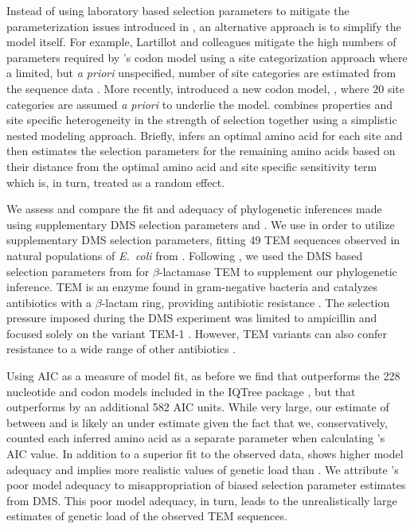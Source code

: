 \documentclass[12pt]{article}
\begin{document}
Instead of using laboratory based selection parameters to mitigate the parameterization issues introduced in \hb, an alternative approach is to simplify the model itself.
For example, Lartillot and colleagues mitigate the high numbers of  parameters required by \hb's codon model using a site categorization approach where a limited, but \emph{a priori} unspecified, number of site categories are estimated from the sequence data \citep{LartillotAndPhilippe2004,le2008,RodrigueEtAl2008,RodrigueAndLartillot2014}.
More recently, \citep{beaulieu2019} introduced a new codon model, \selac, where $20$ site categories are assumed \emph{a priori} to underlie the \hb model.
\selac combines \PC properties and site specific heterogeneity in the strength of selection together using a simplistic nested modeling approach.
Briefly, \selac infers an optimal amino acid for each site and then estimates the selection parameters for the remaining amino acids based on their \PC distance from the optimal amino acid and site specific sensitivity term which is, in turn, treated as a random effect.

We assess and compare the fit and adequacy of phylogenetic inferences made using supplementary DMS selection parameters and \selac. 
We use \phydms \citep{hilton2017} in order to utilize supplementary DMS selection parameters, fitting 49 TEM sequences observed in natural populations of \emph{E.~coli} from \citet{bloom2017}.
Following \citep{bloom2017, hilton2017}, we used the DMS based selection parameters from \citet{stiffler2016} for $\beta$-lactamase TEM to supplement our phylogenetic inference.
TEM is an enzyme found in gram-negative bacteria and catalyzes antibiotics with a $\beta$-lactam ring, providing antibiotic resistance \citep{Neu1969}.
The selection pressure imposed during the DMS experiment was limited to ampicillin and focused solely on the variant TEM-1 \citep{stiffler2016}.
However, TEM variants can also confer resistance to a wide range of other antibiotics \citep{sougakoff1988,sougakoff1989,goussard1991,mabilat1992,chanal1992,brun1994}.

Using AIC as a measure of model fit, as before we find that \phydms outperforms the 228 nucleotide and codon models included in the IQTree package \citep{bloom2014, bloom2017}, but that \selac outperforms \phydms by an additional 582 AIC units.
While very large, our estimate of \DeltaAIC between \selac and \phydms is likely an under estimate given the fact that we, conservatively, counted each inferred amino acid as a separate parameter when calculating \selac's AIC value.
In addition to a superior fit to the observed data, \selac shows higher model adequacy and implies more realistic values of genetic load than \phydms.
We attribute \phydms's poor model adequacy to misappropriation of biased selection parameter estimates from DMS. 
This poor model adequacy, in turn, leads to the unrealistically large estimates of genetic load of the observed TEM sequences.
\end{document}
